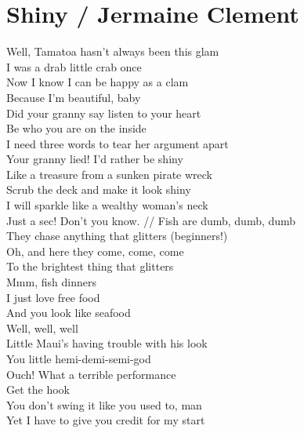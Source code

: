 \section{Shiny / Jermaine Clement}\label{sec:shiny}

\EminorEasy
\Aminor
\EflatMajor
\Gmajor
\Cmajor
\DmajorEasy
\BflatSeven

Well, Tamatoa hasn't always been this glam\\
I was a drab little crab once\\
Now I know I can be happy as a clam\\
Because I'm beautiful, baby \\
Did your granny say listen to your heart\\
Be who you are on the inside\\
I need three words to tear her argument apart\\
Your granny lied! I'd rather be shiny\\
Like a treasure from a sunken pirate wreck\\
Scrub the deck and make it look shiny\\
I will sparkle like a wealthy woman's neck\\
Just a sec! Don't you know. //
Fish are dumb, dumb, dumb\\
They chase anything that glitters (beginners!)\\
Oh, and here they come, come, come\\
To the brightest thing that glitters\\
Mmm, fish dinners\\
I just love free food\\
And you look like seafood \\
Well, well, well\\
Little Maui's having trouble with his look\\
You little hemi-demi-semi-god\\
Ouch! What a terrible performance\\
Get the hook\\
You don't swing it like you used to, man\\
Yet I have to give you credit for my start\\
